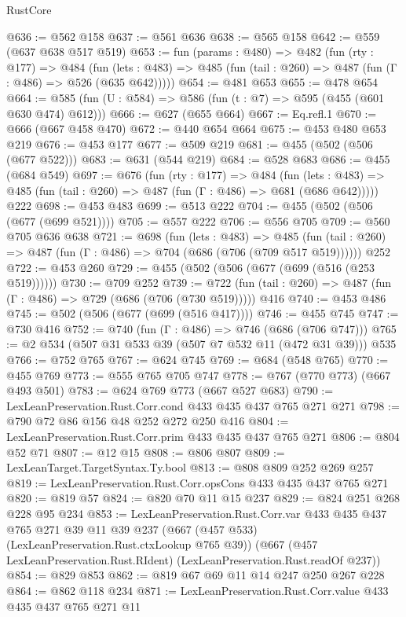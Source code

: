 \begin{lexlean}{RustCore}
\begin{coremodule}
@636 := @562 @158
@637 := @561 @636
@638 := @565 @158
@642 := @559 (@637 @638 @517 @519)
@653 := fun (params : @480) =>
  @482
    (fun (rty : @177) =>
    @484
      (fun (lets : @483) => @485 (fun (tail : @260) => @487 (fun (Γ : @486) => @526 (@635 @642)))))
@654 := @481 @653
@655 := @478 @654
@664 := @585 (fun (U : @584) => @586 (fun (t : @7) => @595 (@455 (@601 @630 @474) @612)))
@666 := @627 (@655 @664)
@667 := Eq.refl.{1}
@670 := @666 (@667 @458 @470)
@672 := @440 @654 @664
@675 := @453 @480 @653 @219
@676 := @453 @177
@677 := @509 @219
@681 := @455 (@502 (@506 (@677 @522)))
@683 := @631 (@544 @219)
@684 := @528 @683
@686 := @455 (@684 @549)
@697 := @676
    (fun (rty : @177) =>
    @484
      (fun (lets : @483) => @485 (fun (tail : @260) => @487 (fun (Γ : @486) => @681 (@686 @642)))))
    @222
@698 := @453 @483
@699 := @513 @222
@704 := @455 (@502 (@506 (@677 (@699 @521))))
@705 := @557 @222
@706 := @556 @705
@709 := @560 @705 @636 @638
@721 := @698
    (fun (lets : @483) =>
    @485 (fun (tail : @260) => @487 (fun (Γ : @486) => @704 (@686 (@706 (@709 @517 @519))))))
    @252
@722 := @453 @260
@729 := @455 (@502 (@506 (@677 (@699 (@516 (@253 @519))))))
@730 := @709 @252
@739 := @722 (fun (tail : @260) => @487 (fun (Γ : @486) => @729 (@686 (@706 (@730 @519))))) @416
@740 := @453 @486
@745 := @502 (@506 (@677 (@699 (@516 @417))))
@746 := @455 @745
@747 := @730 @416
@752 := @740 (fun (Γ : @486) => @746 (@686 (@706 @747)))
@765 := @2 @534 (@507 @31 @533 @39 (@507 @7 @532 @11 (@472 @31 @39))) @535
@766 := @752 @765
@767 := @624 @745
@769 := @684 (@548 @765)
@770 := @455 @769
@773 := @555 @765 @705 @747
@778 := @767 (@770 @773) (@667 @493 @501)
@783 := @624 @769 @773 (@667 @527 @683)
@790 := LexLeanPreservation.Rust.Corr.cond @433 @435 @437 @765 @271 @271
@798 := @790 @72 @86 @156 @48 @252 @272 @250 @416
@804 := LexLeanPreservation.Rust.Corr.prim @433 @435 @437 @765 @271
@806 := @804 @52 @71
@807 := @12 @15
@808 := @806 @807
@809 := LexLeanTarget.TargetSyntax.Ty.bool
@813 := @808 @809 @252 @269 @257
@819 := LexLeanPreservation.Rust.Corr.opsCons @433 @435 @437 @765 @271
@820 := @819 @57
@824 := @820 @70 @11 @15 @237
@829 := @824 @251 @268 @228 @95 @234
@853 := LexLeanPreservation.Rust.Corr.var
    @433
    @435
    @437
    @765
    @271
    @39
    @11
    @39
    @237
    (@667 (@457 @533) (LexLeanPreservation.Rust.ctxLookup @765 @39))
    (@667 (@457 LexLeanPreservation.Rust.RIdent) (LexLeanPreservation.Rust.readOf @237))
@854 := @829 @853
@862 := @819 @67 @69 @11 @14 @247 @250 @267 @228
@864 := @862 @118 @234
@871 := LexLeanPreservation.Rust.Corr.value @433 @435 @437 @765 @271 @11

\end{coremodule}
\end{lexlean}
